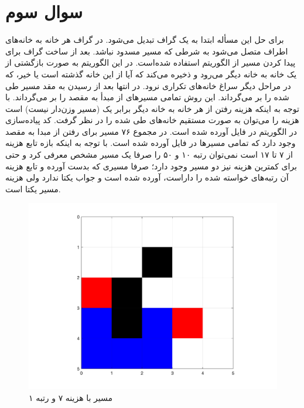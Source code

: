 \section{سوال سوم}
برای حل این مسأله ابتدا  به یک گراف تبدیل می‌شود. در گراف هر خانه به خانه‌های اطراف متصل می‌شود به شرطی که مسیر مسدود نباشد. بعد از ساخت گراف برای پیدا کردن مسیر از الگوریتم 
استفاده شده‌است. در این الگوریتم به صورت بازگشتی از یک خانه به خانه دیگر می‌رود و ذخیره می‌کند که آیا از این خانه گذشته است یا خیر، که در مراحل دیگر سراغ خانه‌های تکراری نرود. در انتها بعد از رسیدن به مقد مسیر طی شده را بر می‌گرداند. این روش تمامی مسیرهای از مبدأ به مقصد را بر می‌گرداند. با توجه به اینکه هزینه رفتن از هر خانه به خانه دیگر برابر یک (مسیر وزن‌دار نیست) است هزینه را می‌توان به صورت مستقیم خانه‌های طی شده را در نظر گرفت.
کد پیاده‌سازی در الگوریتم  در فایل  آورده شده است.
 در مجموع ۷۶ مسیر برای رفتن از مبدا به مقصد وجود دارد که تمامی مسیرها در فایل
 آورده شده است. با توجه به اینکه بازه تابع هزینه از ۷ تا ۱۷ است نمی‌توان رتبه ۱۰ و ۵۰ را صرفا یک مسیر مشخص معرفی کرد و حتی برای کمترین هزینه نیز دو مسیر وجود دارد؛ صرفا مسیری که  بدست آورده و تابع هزینه آن رتبه‌های خواسته شده را داراست، آورده شده است و جواب یکتا ندارد ولی هزینه مسیر یکتا است.
 \begin{figure}[!h]
 	 	\centering
 	\includegraphics[width=12cm]{../Figure/Q3/1th_path.png}

 	\caption{مسیر با هزینه ۷ و رتبه ۱}
 \end{figure}

